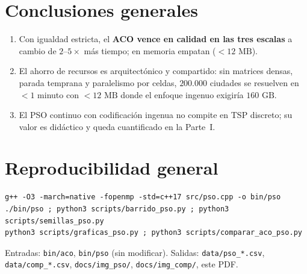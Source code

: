 \documentclass[11pt,a4paper]{article}
\begin{document}
\section{Conclusiones generales}
\begin{enumerate}
\item Con igualdad estricta, el \textbf{ACO vence en calidad en las tres escalas} a cambio de $2$--$5\times$ más tiempo; en memoria empatan ($<12\text{ MB}$).
\item El ahorro de recursos es arquitectónico y compartido: sin matrices densas, parada temprana y paralelismo por celdas, $200.000$ ciudades se resuelven en $<1$ minuto con $<12\text{ MB}$ donde el enfoque ingenuo exigiría $160\text{ GB}$.
\item El PSO continuo con codificación ingenua no compite en TSP discreto; su valor es didáctico y queda cuantificado en la Parte~I.
\end{enumerate}

\section*{Reproducibilidad general}
\begin{verbatim}
g++ -O3 -march=native -fopenmp -std=c++17 src/pso.cpp -o bin/pso
./bin/pso ; python3 scripts/barrido_pso.py ; python3 scripts/semillas_pso.py
python3 scripts/graficas_pso.py ; python3 scripts/comparar_aco_pso.py
\end{verbatim}
Entradas: \texttt{bin/aco}, \texttt{bin/pso} (sin modificar). Salidas: \texttt{data/pso\_*.csv}, \texttt{data/comp\_*.csv}, \texttt{docs/img\_pso/}, \texttt{docs/img\_comp/}, este PDF.
\end{document}
